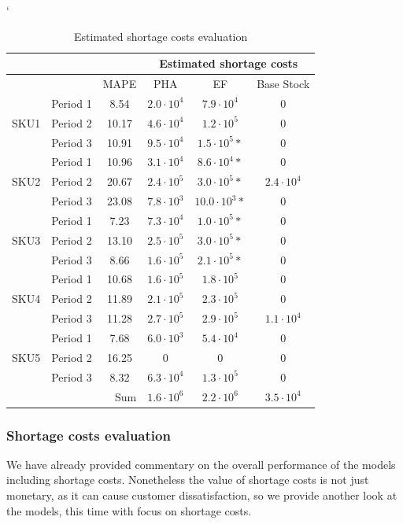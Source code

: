 \documentclass[11pt,a4paper]{article}
\begin{document}
\begin{table} \catcode`
\centering
\begin{tabular}{|c|c|c|c|c|c|}
\hline
\multicolumn{3}{|c|}{} &\multicolumn{3}{|c|}{Estimated shortage costs} \\ \hline
\multicolumn{2}{|c|}{}& MAPE &  PHA & EF & Base Stock \\ \hline
\multirow{ 3}{*}{SKU1}& Period 1 & 8.54 & $2.0\cdot 10^4 $ & $7.9\cdot 10^4 $ & 0\\  \cline{2-6}
& Period 2 & 10.17 & $4.6\cdot 10^4 $ & $1.2\cdot 10^5 $ & 0\\  \cline{2-6}
& Period 3 & 10.91 & $9.5\cdot 10^4 $ & $1.5\cdot 10^5 *$ & 0\\ \hline 
\multirow{ 3}{*}{SKU2}& Period 1 & 10.96 & $3.1\cdot 10^4 $ & $8.6\cdot 10^4 *$ & 0\\  \cline{2-6}
& Period 2 & 20.67 & $2.4\cdot 10^5 $ & $3.0\cdot 10^5 *$ & $2.4\cdot 10^4 $\\  \cline{2-6}
& Period 3 & 23.08 & $7.8\cdot 10^3 $ & $10.0\cdot 10^3 *$ & 0\\ \hline 
\multirow{ 3}{*}{SKU3}& Period 1 & 7.23 & $7.3\cdot 10^4 $ & $1.0\cdot 10^5 *$ & 0\\  \cline{2-6}
& Period 2 & 13.10 & $2.5\cdot 10^5 $ & $3.0\cdot 10^5 *$ & 0\\  \cline{2-6}
& Period 3 & 8.66 & $1.6\cdot 10^5 $ & $2.1\cdot 10^5 *$ & 0\\ \hline 
\multirow{ 3}{*}{SKU4}& Period 1 & 10.68 & $1.6\cdot 10^5 $ & $1.8\cdot 10^5 $ & 0\\  \cline{2-6}
& Period 2 & 11.89 & $2.1\cdot 10^5 $ & $2.3\cdot 10^5 $ & 0\\  \cline{2-6}
& Period 3 & 11.28 & $2.7\cdot 10^5 $ & $2.9\cdot 10^5 $ & $1.1\cdot 10^4 $\\ \hline 
\multirow{ 3}{*}{SKU5}& Period 1 & 7.68 & $6.0\cdot 10^3 $ & $5.4\cdot 10^4 $ & 0\\  \cline{2-6}
& Period 2 & 16.25 & 0 & 0 & 0\\  \cline{2-6}
& Period 3 & 8.32 & $6.3\cdot 10^4 $ & $1.3\cdot 10^5 $ & 0\\ \hline 
 \multicolumn{3}{|r|}{Sum }& $1.6\cdot 10^6$ & $2.2\cdot 10^6$ & $3.5\cdot 10^4$\\ \hline 
\end{tabular}
\caption{Estimated shortage costs evaluation}
\label{tbl:shortage_costs}
\end{table}
\subsubsection{Shortage costs evaluation}
We have already provided commentary on the overall performance of the models including shortage costs. Nonetheless the value of shortage costs is not just monetary, as it can cause customer dissatisfaction, so we provide another look at the models, this time with focus on shortage costs.  
\end{document}

